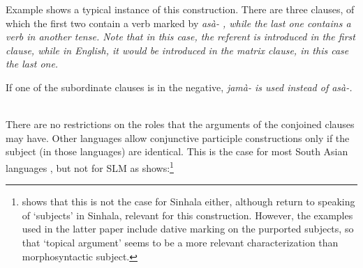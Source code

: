 Example  shows a typical instance of this construction. There are three clauses, of which the first two contain a verb marked by \em asà- \em, while the last one contains a verb in another tense. Note that in this case, the referent  is introduced in the first clause, while in English, it would be introduced in the matrix clause, in this case the last one.



If one of the subordinate clauses is in the negative, \em jamà- \em {} is used instead of \em asà-\em.
 
 \\

There are no restrictions on the roles that the arguments of the conjoined clauses may have. Other languages allow conjunctive participle constructions only if the subject (in those languages) are identical. This is the case for most South Asian languages \citep[108]{Masica1976}, but not for SLM  as  shows:\footnote{\citet[58]{Gair1976sinhalasubject} shows that this is not the case for Sinhala either, although \citet{GairEtAl1989Sinhalaacquisition} return to speaking of `subjects' in Sinhala, relevant for this construction. However, the examples used in the latter paper include dative marking on the purported subjects, so that `topical argument' seems to be a more relevant characterization than morphosyntactic subject.}

